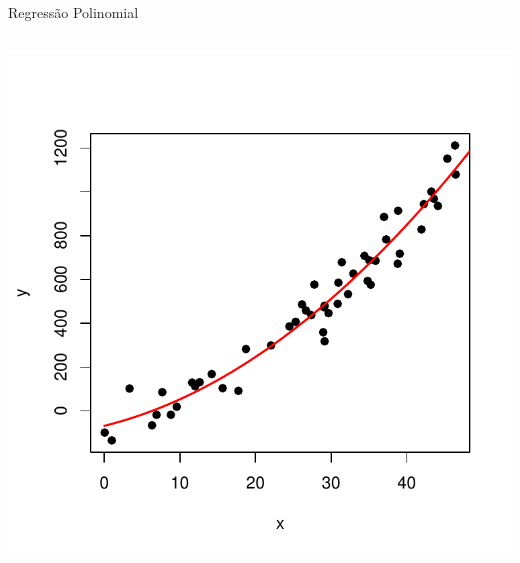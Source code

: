 \documentclass{beamer}\usepackage[]{graphicx}\usepackage[]{color}
\newenvironment{knitrout}{}{} %
\renewenvironment{knitrout}{\setlength{\topsep}{0mm}}{}
\begin{document}
\begin{frame}[fragile]{Regressão Polinomial}
\begin{columns}
\begin{knitrout}
\color{fgcolor}
\includegraphics[width=1\linewidth]{figure/samppol2plot-1} 

\end{knitrout}


\end{columns}

\end{frame}
\end{document}
